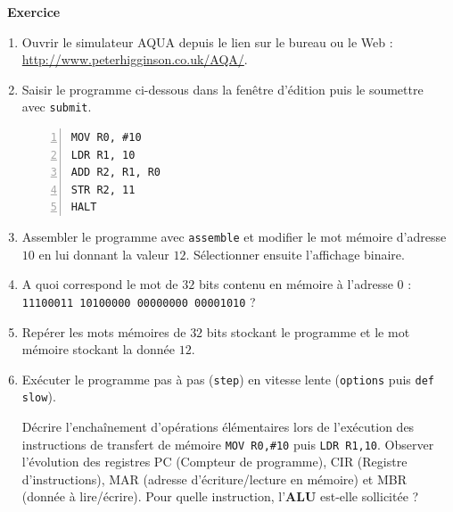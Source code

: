 \documentclass[a4paper, french, 11pt]{article}  %
\newcounter{def}
\newcounter{exercice}
\newenvironment{exercice}[1]
{\par \medskip   \addtocounter{exercice}{1} \noindent  
\begin{bclogo}[arrondi =0.1,   noborder = true, logo=\bccrayon, marge=4]{~\textbf{Exercice} \textbf{\theexercice} {\itshape #1} }  \par}
{
\end{bclogo}
 \par \bigskip }
\newcounter{prog}
\begin{document}
\begin{exercice}{}


\begin{enumerate}
	\item Ouvrir le simulateur AQUA depuis le lien sur le bureau ou le Web : \url{http://www.peterhigginson.co.uk/AQA/}.
	
	\item Saisir le programme ci-dessous dans la fenêtre d'édition puis le soumettre avec \texttt{submit}.
	
\begin{lstlisting}[numbers=left]
MOV R0, #10
LDR R1, 10
ADD R2, R1, R0
STR R2, 11
HALT
\end{lstlisting}

\item Assembler le programme avec \texttt{assemble} et modifier le mot mémoire d'adresse $10$ en lui donnant la valeur $12$. Sélectionner ensuite l'affichage binaire.

\item A quoi correspond le mot de $32$ bits contenu en mémoire à l'adresse $0$ : \texttt{11100011 10100000 00000000 00001010} ?

\item Repérer les  mots mémoires de $32$ bits stockant le programme et le mot mémoire stockant la donnée $12$.

\item Exécuter le programme pas à pas (\texttt{step})  en vitesse lente (\texttt{options} puis \texttt{def slow}).

Décrire l'enchaînement d'opérations élémentaires lors de l'exécution des instructions de transfert de mémoire \texttt{MOV R0,\#10} puis \texttt{LDR R1,10}. Observer l'évolution des registres PC (Compteur de programme), CIR (Registre d'instructions), MAR (adresse d'écriture/lecture en mémoire) et MBR (donnée à lire/écrire). Pour quelle instruction, l'\textbf{ALU} est-elle sollicitée ?
     



\end{enumerate}

\end{exercice}
\end{document}
